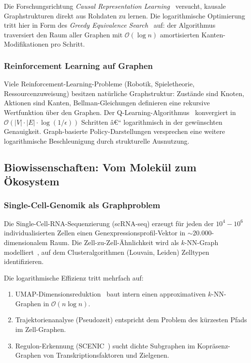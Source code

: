 ﻿\documentclass[12pt,a4paper,twoside]{article}
\theoremstyle{definition}
\theoremstyle{plain}
\theoremstyle{remark}
\begin{document}
Die Forschungsrichtung \emph{Causal Representation Learning}~\cite{Scholkopf2021}
versucht, kausale Graphstrukturen direkt aus Rohdaten zu
lernen.  Die logarithmische Optimierung tritt hier in Form
des \emph{Greedy Equivalence Search}~\cite{Chickering2002}
auf: der Algorithmus traversiert den Raum aller Graphen mit
$\mathcal{O}(\log n)$ amortisierten Kanten-Modifikationen pro Schritt.

\subsubsection{Reinforcement Learning auf Graphen}

Viele Reinforcement-Learning-Probleme (Robotik, Spieletheorie,
Ressourcenzuweisung) besitzen natürliche Graphstruktur:
Zustände sind Knoten, Aktionen sind Kanten,
Bellman-Gleichungen definieren eine rekursive Wertfunktion
über den Graphen.  Der Q-Learning-Algorithmus~\cite{Watkins1992}
konvergiert in $\mathcal{O}(|V| \cdot |E| \cdot \log(1/\epsilon))$
Schritten â€“ logarithmisch in der gewünschten Genauigkeit.
Graph-basierte Policy-Darstellungen versprechen eine weitere
logarithmische Beschleunigung durch strukturelle Ausnutzung.

\subsection{Biowissenschaften: Vom Molekül zum Ökosystem}
\label{sub:bio}

\subsubsection{Single-Cell-Genomik als Graphproblem}

Die Single-Cell-RNA-Sequenzierung (scRNA-seq) erzeugt für
jeden der $10^4{-}10^6$ individualisierten Zellen einen
Genexpressionsprofil-Vektor in $\sim 20.000$-dimensionalem
Raum.  Die Zell-zu-Zell-Ähnlichkeit wird als $k$-NN-Graph
modelliert~\cite{Wolf2018}, auf dem Clusteralgorithmen
(Louvain, Leiden) Zelltypen identifizieren.

Die logarithmische Effizienz tritt mehrfach auf:
\begin{enumerate}
  \item UMAP-Dimensionsreduktion~\cite{McInnes2018} baut
        intern einen approximativen $k$-NN-Graphen in
        $\mathcal{O}(n \log n)$.
  \item Trajektorienanalyse (Pseudozeit) entspricht dem
        Problem des kürzesten Pfads im Zell-Graphen.
  \item Regulon-Erkennung (SCENIC~\cite{Aibar2017}) sucht
        dichte Subgraphen im Kopräsenz-Graphen von
        Transkriptionsfaktoren und Zielgenen.
\end{enumerate}
\end{document}
